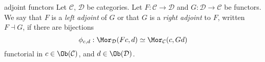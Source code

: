 \begin{frame}
\begin{block}{adjoint functors}
Let $\mathcal{C}$, $\mathcal{D}$ be categories.
Let $F : \mathcal{C} \to \mathcal{D}$ and
$G : \mathcal{D} \to \mathcal{C}$ be functors.
We say that $F$ is a {\it left adjoint} of $G$ or that
$G$ is a {\it right adjoint} to $F$, written $F \dashv G$, if there are bijections
$$
\phi_{c,d}:\Mor_\mathcal{D}(Fc, d)
\simeq
\Mor_\mathcal{C}(c, Gd)
$$
functorial in $c \in \Ob(\mathcal{C})$, and
$d \in \Ob(\mathcal{D})$.
\end{block}
\end{frame}